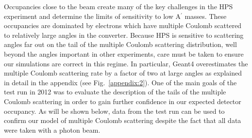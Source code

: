 Occupancies close to the beam create many of the key challenges in the HPS experiment
and determine the limits of sensitivity to low A$^\prime$ masses.
These occupancies are dominated by electrons which have multiple Coulomb scattered to relatively large angles in the converter. Because HPS is sensitive to scattering angles far out on the tail of the multiple Coulomb scattering distribution, well beyond the angles important in other experiments, care must be taken
to ensure our simulations are correct in this regime.  In particular,
Geant4 overestimates the multiple Coulomb scattering rate by a factor of two  
at large angles as explained in detail in the appendix (see Fig.~\ref{appendix:2}).
One of the main goals of the test run in 2012 was to evaluate the description of the tails of the multiple Coulomb scattering in order 
to gain further confidence in our expected detector occupancy. As will be shown below, data from the 
test run can be used to confirm our model of multiple Coulomb scattering despite the fact that 
all data were taken with a photon beam.

